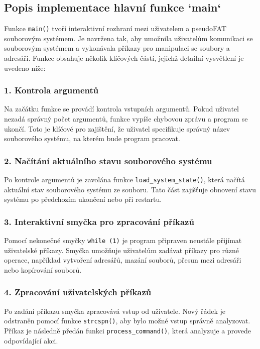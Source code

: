 \documentclass[12pt]{article}
\begin{document}
\subsection*{Popis implementace hlavní funkce `main`}
Funkce \texttt{main()} tvoří interaktivní rozhraní mezi uživatelem a pseudoFAT souborovým systémem. Je navržena tak, aby umožnila uživatelům komunikaci se souborovým systémem a vykonávala příkazy pro manipulaci se soubory a adresáři. Funkce obsahuje několik klíčových částí, jejichž detailní vysvětlení je uvedeno níže:

\subsubsection*{1. Kontrola argumentů}
Na začátku funkce se provádí kontrola vstupních argumentů. Pokud uživatel nezadá správný počet argumentů, funkce vypíše chybovou zprávu a program se ukončí. Toto je klíčové pro zajištění, že uživatel specifikuje správný název souborového systému, na kterém bude program pracovat.

\subsubsection*{2. Načítání aktuálního stavu souborového systému}
Po kontrole argumentů je zavolána funkce \texttt{load\_system\_state()}, která načítá aktuální stav souborového systému ze souboru. Tato část zajišťuje obnovení stavu systému po předchozím ukončení nebo při restartu.

\subsubsection*{3. Interaktivní smyčka pro zpracování příkazů}
Pomocí nekonečné smyčky \texttt{while (1)} je program připraven neustále přijímat uživatelské příkazy. Smyčka umožňuje uživatelům zadávat příkazy pro různé operace, například vytvoření adresářů, mazání souborů, přesun mezi adresáři nebo kopírování souborů.

\subsubsection*{4. Zpracování uživatelských příkazů}
Po zadání příkazu smyčka zpracovává vstup od uživatele. Nový řádek je odstraněn pomocí funkce \texttt{strcspn()}, aby bylo možné vstup správně analyzovat. Příkaz je následně předán funkci \texttt{process\_command()}, která analyzuje a provede odpovídající akci.
\end{document}
